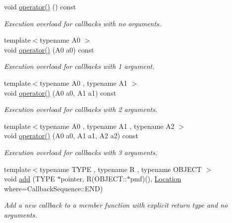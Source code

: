 \begin{DoxyCompactItemize}
void \hyperlink{struct_d_d4hep_1_1_callback_sequence_ae4fc09e6d68a198eba141cffc1875479}{operator()} () const 
\begin{DoxyCompactList}\small\item\em Execution overload for callbacks with no arguments. \item\end{DoxyCompactList}\item 
{\footnotesize template$<$typename A0 $>$ }\\void \hyperlink{struct_d_d4hep_1_1_callback_sequence_a020fb8efdc61f29ac5d8740d96912af3}{operator()} (A0 a0) const 
\begin{DoxyCompactList}\small\item\em Execution overload for callbacks with 1 argument. \item\end{DoxyCompactList}\item 
{\footnotesize template$<$typename A0 , typename A1 $>$ }\\void \hyperlink{struct_d_d4hep_1_1_callback_sequence_ae44f3102042e74244b739d273b0e7e24}{operator()} (A0 a0, A1 a1) const 
\begin{DoxyCompactList}\small\item\em Execution overload for callbacks with 2 arguments. \item\end{DoxyCompactList}\item 
{\footnotesize template$<$typename A0 , typename A1 , typename A2 $>$ }\\void \hyperlink{struct_d_d4hep_1_1_callback_sequence_a00453acada1059910e01af33f61d9b93}{operator()} (A0 a0, A1 a1, A2 a2) const 
\begin{DoxyCompactList}\small\item\em Execution overload for callbacks with 3 arguments. \item\end{DoxyCompactList}\item 
{\footnotesize template$<$typename TYPE , typename R , typename OBJECT $>$ }\\void \hyperlink{struct_d_d4hep_1_1_callback_sequence_aa230d1d7e0c5a15b469a8997c90d738c}{add} (TYPE $\ast$pointer, R(OBJECT::$\ast$pmf)(), \hyperlink{struct_d_d4hep_1_1_callback_sequence_a7753490247479633aed16a2376821ef7}{Location} where=CallbackSequence::END)
\begin{DoxyCompactList}\small\item\em Add a new callback to a member function with explicit return type and no arguments. \item\end{DoxyCompactList}\item 

\end{DoxyCompactItemize}
